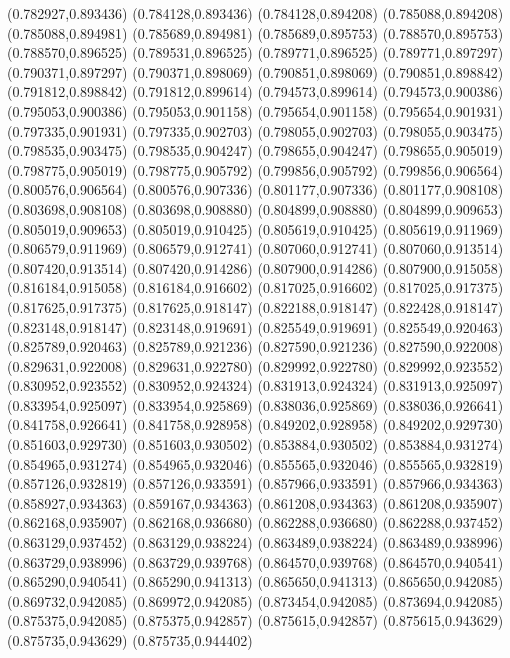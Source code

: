 (0.782927,0.893436)
(0.784128,0.893436)
(0.784128,0.894208)
(0.785088,0.894208)
(0.785088,0.894981)
(0.785689,0.894981)
(0.785689,0.895753)
(0.788570,0.895753)
(0.788570,0.896525)
(0.789531,0.896525)
(0.789771,0.896525)
(0.789771,0.897297)
(0.790371,0.897297)
(0.790371,0.898069)
(0.790851,0.898069)
(0.790851,0.898842)
(0.791812,0.898842)
(0.791812,0.899614)
(0.794573,0.899614)
(0.794573,0.900386)
(0.795053,0.900386)
(0.795053,0.901158)
(0.795654,0.901158)
(0.795654,0.901931)
(0.797335,0.901931)
(0.797335,0.902703)
(0.798055,0.902703)
(0.798055,0.903475)
(0.798535,0.903475)
(0.798535,0.904247)
(0.798655,0.904247)
(0.798655,0.905019)
(0.798775,0.905019)
(0.798775,0.905792)
(0.799856,0.905792)
(0.799856,0.906564)
(0.800576,0.906564)
(0.800576,0.907336)
(0.801177,0.907336)
(0.801177,0.908108)
(0.803698,0.908108)
(0.803698,0.908880)
(0.804899,0.908880)
(0.804899,0.909653)
(0.805019,0.909653)
(0.805019,0.910425)
(0.805619,0.910425)
(0.805619,0.911969)
(0.806579,0.911969)
(0.806579,0.912741)
(0.807060,0.912741)
(0.807060,0.913514)
(0.807420,0.913514)
(0.807420,0.914286)
(0.807900,0.914286)
(0.807900,0.915058)
(0.816184,0.915058)
(0.816184,0.916602)
(0.817025,0.916602)
(0.817025,0.917375)
(0.817625,0.917375)
(0.817625,0.918147)
(0.822188,0.918147)
(0.822428,0.918147)
(0.823148,0.918147)
(0.823148,0.919691)
(0.825549,0.919691)
(0.825549,0.920463)
(0.825789,0.920463)
(0.825789,0.921236)
(0.827590,0.921236)
(0.827590,0.922008)
(0.829631,0.922008)
(0.829631,0.922780)
(0.829992,0.922780)
(0.829992,0.923552)
(0.830952,0.923552)
(0.830952,0.924324)
(0.831913,0.924324)
(0.831913,0.925097)
(0.833954,0.925097)
(0.833954,0.925869)
(0.838036,0.925869)
(0.838036,0.926641)
(0.841758,0.926641)
(0.841758,0.928958)
(0.849202,0.928958)
(0.849202,0.929730)
(0.851603,0.929730)
(0.851603,0.930502)
(0.853884,0.930502)
(0.853884,0.931274)
(0.854965,0.931274)
(0.854965,0.932046)
(0.855565,0.932046)
(0.855565,0.932819)
(0.857126,0.932819)
(0.857126,0.933591)
(0.857966,0.933591)
(0.857966,0.934363)
(0.858927,0.934363)
(0.859167,0.934363)
(0.861208,0.934363)
(0.861208,0.935907)
(0.862168,0.935907)
(0.862168,0.936680)
(0.862288,0.936680)
(0.862288,0.937452)
(0.863129,0.937452)
(0.863129,0.938224)
(0.863489,0.938224)
(0.863489,0.938996)
(0.863729,0.938996)
(0.863729,0.939768)
(0.864570,0.939768)
(0.864570,0.940541)
(0.865290,0.940541)
(0.865290,0.941313)
(0.865650,0.941313)
(0.865650,0.942085)
(0.869732,0.942085)
(0.869972,0.942085)
(0.873454,0.942085)
(0.873694,0.942085)
(0.875375,0.942085)
(0.875375,0.942857)
(0.875615,0.942857)
(0.875615,0.943629)
(0.875735,0.943629)
(0.875735,0.944402)
